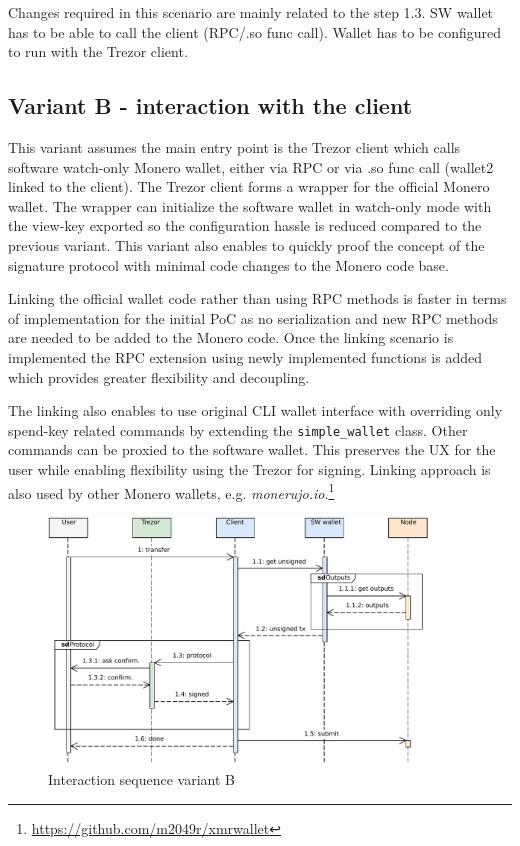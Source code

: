 \documentclass[]{article}
\begin{document}
Changes required in this scenario are mainly related to the step 1.3. SW wallet has to be able to call the client (RPC/.so func call). Wallet has to be configured to run with the Trezor client.

\subsection{Variant B - interaction with the client}
This variant assumes the main entry point is the Trezor client which calls software watch-only Monero wallet, either via RPC or via .so func call (wallet2 linked to the client). The Trezor client forms a wrapper for the official Monero wallet. The wrapper can initialize the software wallet in watch-only mode with the view-key exported so the configuration hassle is reduced compared to the previous variant. This variant also enables to quickly proof the concept of the signature protocol with minimal code changes to the Monero code base. 

Linking the official wallet code rather than using RPC methods is faster in terms of implementation for the initial PoC as no serialization and new RPC methods are needed to be added to the Monero code. Once the linking scenario is implemented the RPC extension using newly implemented functions is added which provides greater flexibility and decoupling.

The linking also enables to use original CLI wallet interface with overriding only spend-key related commands by extending the \verb|simple_wallet| class. Other commands can be proxied to the software wallet. This preserves the UX for the user while enabling flexibility using the Trezor for signing. Linking approach is also used by other Monero wallets, e.g. \emph{monerujo.io}.\footnote{\url{https://github.com/m2049r/xmrwallet}}

\begin{figure}[H]
	\centering
	\includegraphics[width=0.9\textwidth, angle=0]{img/variantB.pdf}
	\caption{Interaction sequence variant B}
\end{figure}
\end{document}
